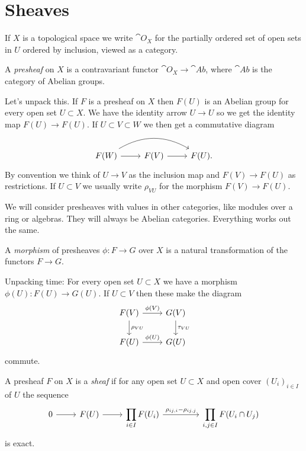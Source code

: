 \section{Sheaves}


If $X$ is a topological space we write $\cat O_X$ for the partially ordered set of open sets in $U$ ordered by inclusion, viewed as a category.


\begin{defi}
A \emph{presheaf} on $X$ is a contravariant functor $\cat O_X \to \cat{Ab}$, where $\cat{Ab}$ is the category of Abelian groups.
\end{defi}

Let's unpack this.
If $F$ is a presheaf on $X$ then $F(U)$ is an Abelian group for every open set $U \subset X$.
We have the identity arrow $U \to U$ so we get the identity map $F(U) \to F(U)$.
If $U \subset V \subset W$ we then get a commutative diagram
\[
\begin{tikzcd}
F(W) \ar[rr, bend left=30] \ar[r] &
F(V) \ar[r] &
F(U).
\end{tikzcd}
\]
By convention we think of $U \to V$ as the inclusion map and $F(V) \to F(U)$ as restrictions.
If $U \subset V$ we usually write $\rho_{VU}$ for the morphism $F(V) \to F(U)$.

We will consider presheaves with values in other categories, like modules over a ring or algebras.
They will always be Abelian categories.
Everything works out the same.


\begin{defi}
A \emph{morphism} of presheaves $\phi : F \to G$ over $X$ is a natural transformation of the functors $F \to G$.
\end{defi}


Unpacking time:
For every open set $U \subset X$ we have a morphism $\phi(U) : F(U) \to G(U)$.
If $U \subset V$ then these make the diagram
\[
\begin{tikzcd}
F(V) \ar[r,"\phi(V)"] \ar[d,"\rho_{VU}"] &
G(V) \ar[d,"\tau_{VU}"] \\
F(U) \ar[r,"\phi(U)"] &
G(U)
\end{tikzcd}
\]
commute.



\begin{defi}
A presheaf $F$ on $X$ is a \emph{sheaf} if for any open set $U \subset X$ and open cover $(U_i)_{i \in I}$ of $U$ the sequence
\[
\begin{tikzcd}
0 \ar[r] &
F(U) \ar[r] &
\displaystyle
\prod_{i \in I} F(U_i) \ar[r,"\rho_{ij,i} - \rho_{ij,j}"] &[2em]
\displaystyle
\prod_{i,j \in I} F(U_i \cap U_j)
\end{tikzcd}
\]
is exact.
\end{defi}

